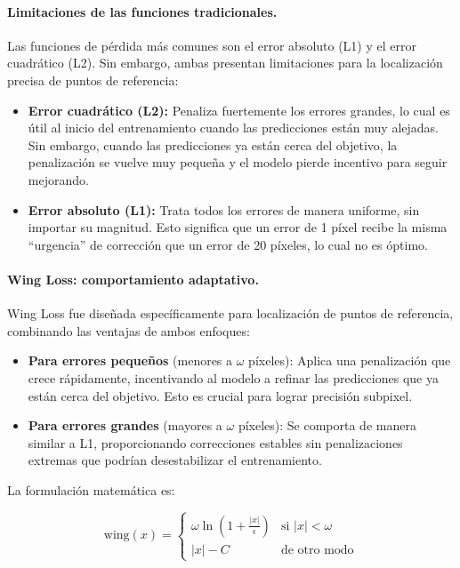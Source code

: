 \paragraph{Limitaciones de las funciones tradicionales.}
Las funciones de pérdida más comunes son el error absoluto (L1) y el error cuadrático (L2). Sin embargo, ambas presentan limitaciones para la localización precisa de puntos de referencia:

\begin{itemize}
    \item \textbf{Error cuadrático (L2):} Penaliza fuertemente los errores grandes, lo cual es útil al inicio del entrenamiento cuando las predicciones están muy alejadas. Sin embargo, cuando las predicciones ya están cerca del objetivo, la penalización se vuelve muy pequeña y el modelo pierde incentivo para seguir mejorando.

    \item \textbf{Error absoluto (L1):} Trata todos los errores de manera uniforme, sin importar su magnitud. Esto significa que un error de 1 píxel recibe la misma ``urgencia'' de corrección que un error de 20 píxeles, lo cual no es óptimo.
\end{itemize}

\paragraph{Wing Loss: comportamiento adaptativo.}
Wing Loss \cite{feng2018wing} fue diseñada específicamente para localización de puntos de referencia, combinando las ventajas de ambos enfoques:

\begin{itemize}
    \item \textbf{Para errores pequeños} (menores a $\omega$ píxeles): Aplica una penalización que crece rápidamente, incentivando al modelo a refinar las predicciones que ya están cerca del objetivo. Esto es crucial para lograr precisión subpixel.

    \item \textbf{Para errores grandes} (mayores a $\omega$ píxeles): Se comporta de manera similar a L1, proporcionando correcciones estables sin penalizaciones extremas que podrían desestabilizar el entrenamiento.
\end{itemize}

La formulación matemática es:

\begin{equation}
    \text{wing}(x) =
    \begin{cases}
        \omega \ln\left(1 + \frac{|x|}{\epsilon}\right) & \text{si } |x| < \omega \\
        |x| - C & \text{de otro modo}
    \end{cases}
    \label{eq:wing_loss}
\end{equation}


